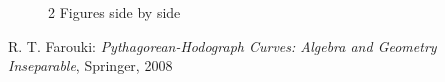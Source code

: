 \documentclass[12pt]{article}
\begin{document}
\begin{figure}[h]
    \centering
    \qquad
    \caption{2 Figures side by side}%
    \label{fig:example}%
\end{figure}



\begin{thebibliography}{1}
	 R. T. Farouki: \textit{Pythagorean-Hodograph Curves: Algebra and Geometry Inseparable}, Springer, 2008
\end{thebibliography}
\end{document}
